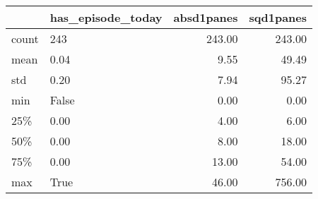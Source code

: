 \begin{tabular}{llrr}
\toprule
{} & has\_episode\_today &  absd1panes &  sqd1panes \\
\midrule
count &               243 &      243.00 &     243.00 \\
mean  &              0.04 &        9.55 &      49.49 \\
std   &              0.20 &        7.94 &      95.27 \\
min   &             False &        0.00 &       0.00 \\
25\%   &              0.00 &        4.00 &       6.00 \\
50\%   &              0.00 &        8.00 &      18.00 \\
75\%   &              0.00 &       13.00 &      54.00 \\
max   &              True &       46.00 &     756.00 \\
\bottomrule
\end{tabular}
